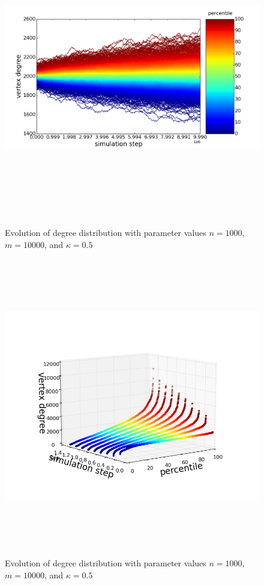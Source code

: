 \documentclass[11pt]{article}
\begin{document}
\begin{figure}[h!]
  \centering
  \includegraphics[height=130mm]{n_1000_short}
  \caption{Evolution of degree distribution with parameter values $n=1000$, $m=10000$, and $\kappa=0.5$}
  \label{fig:1000sv}
\end{figure}
\begin{figure}[h!]
  \centering
  \includegraphics[height=130mm]{n_1000_long_3d}
  \caption{Evolution of degree distribution with parameter values $n=1000$, $m=10000$, and $\kappa=0.5$}
  \label{fig:1000s3}
\end{figure}
\end{document}
